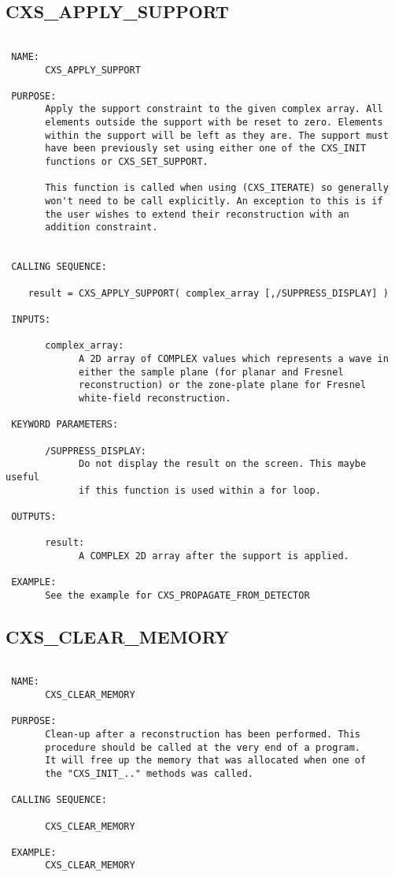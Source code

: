 \subsection{CXS\_APPLY\_SUPPORT}
\begin{verbatim}

 NAME:
       CXS_APPLY_SUPPORT

 PURPOSE:
       Apply the support constraint to the given complex array. All
       elements outside the support with be reset to zero. Elements
       within the support will be left as they are. The support must
       have been previously set using either one of the CXS_INIT 
       functions or CXS_SET_SUPPORT.

       This function is called when using (CXS_ITERATE) so generally
       won't need to be call explicitly. An exception to this is if
       the user wishes to extend their reconstruction with an
       addition constraint.


 CALLING SEQUENCE:

	result = CXS_APPLY_SUPPORT( complex_array [,/SUPPRESS_DISPLAY] )

 INPUTS:

       complex_array:
             A 2D array of COMPLEX values which represents a wave in
             either the sample plane (for planar and Fresnel
             reconstruction) or the zone-plate plane for Fresnel 
             white-field reconstruction.

 KEYWORD PARAMETERS:

       /SUPPRESS_DISPLAY:
             Do not display the result on the screen. This maybe useful
             if this function is used within a for loop. 

 OUTPUTS:

       result:
             A COMPLEX 2D array after the support is applied.

 EXAMPLE:
       See the example for CXS_PROPAGATE_FROM_DETECTOR

\end{verbatim}




\subsection{CXS\_CLEAR\_MEMORY}
\begin{verbatim}

 NAME:
       CXS_CLEAR_MEMORY

 PURPOSE:
       Clean-up after a reconstruction has been performed. This 
       procedure should be called at the very end of a program.
       It will free up the memory that was allocated when one of 
       the "CXS_INIT_.." methods was called.

 CALLING SEQUENCE:

       CXS_CLEAR_MEMORY

 EXAMPLE:
       CXS_CLEAR_MEMORY

\end{verbatim}

